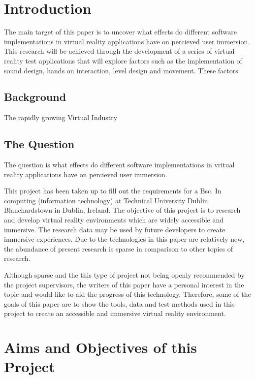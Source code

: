 \chapter{Introduction}
The main target of this paper is to uncover what effects do different software implementations in virtual reality applications have on percieved user immersion. This research will be achieved through the development of a series of virtual reality test applications that will explore factors such as the implementation of sound design, hands on interaction, level design and movement.
These factors

\section{Background}
The rapidly growing Virtual Industry
\section{The Question}
The question is what effects do different software implementations in vritual reality applications have on percieved user immersion. 



This project has been taken up to fill out the requirements for a Bsc. In computing (information technology) at Technical University Dublin Blanchardstown in Dublin, Ireland. The objective of this project is to research and develop virtual reality environments which are widely accessible and immersive. The research data may be used by future developers to create immersive experiences.  
Due to the technologies in this paper are relatively new, the abundance of present research is sparse in comparison to other topics of research. 

Although sparse and the this type of project not being openly recommended by the project supervisors, the writers of this paper have a personal interest in the topic and would like to aid the progress of this technology.  Therefore, some of the goals of this paper are to show the tools, data and test methods used in this project to create an accessible and immersive virtual reality environment. 


\chapter{Aims and Objectives of this Project}

